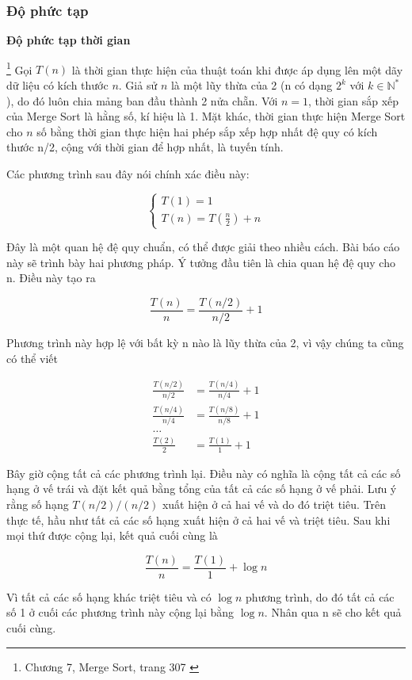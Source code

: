 \subsubsection{Độ phức tạp}
\textbf{Độ phức tạp thời gian}

\footnote{Chương 7, Merge Sort, trang 307 \cite{dsa-analysis-cpp}} Gọi $T(n)$ là thời gian thực hiện của thuật toán khi được áp dụng lên một dãy dữ liệu có kích thước $n$.
Giả sử $n$ là một lũy thừa của 2 (n có dạng $2^k$ với $k \in \mathbb{N}^*$), do đó luôn chia mảng ban đầu thành 2 nửa chẵn. Với $n = 1$, thời gian sắp xếp của Merge Sort là hằng số, kí hiệu là 1. Mặt khác, thời gian thực hiện Merge Sort cho $n$ số bằng thời gian thực hiện hai phép sắp xếp hợp nhất đệ quy có kích thước n/2, cộng với thời gian để hợp nhất, là tuyến tính. 

Các phương trình sau đây nói chính xác điều này:

$$\left\{
\begin{array}{l}
        T(1) = 1 \\
        T(n) = T(\frac{n}{2}) + n
\end{array}
\right.$$

Đây là một quan hệ đệ quy chuẩn, có thể được giải theo nhiều cách. Bài báo cáo này sẽ trình bày hai phương pháp. Ý tưởng đầu tiên là chia quan hệ đệ quy cho n. Điều này tạo ra

$$\frac{T(n)}{n} = \frac{T(n / 2)}{n / 2} + 1$$

Phương trình này hợp lệ với bất kỳ n nào là lũy thừa của 2, vì vậy chúng ta cũng có thể viết 

\begin{align*}
    \frac{T(n/2)}{n/2} &= \frac{T(n / 4)}{n / 4} + 1 \\
    \frac{T(n/4)}{n/4} &= \frac{T(n / 8)}{n / 8} + 1 \\
    \dots \\
    \frac{T(2)}{2} &= \frac{T(1)}{1} + 1
\end{align*}

Bây giờ cộng tất cả các phương trình lại. Điều này có nghĩa là cộng tất cả các số hạng ở vế trái và đặt kết quả bằng tổng của tất cả các số hạng ở vế phải. Lưu ý rằng số hạng $T(n/2)/(n/2)$ xuất hiện ở cả hai vế và do đó triệt tiêu. Trên thực tế, hầu như tất cả các số hạng xuất hiện ở cả hai vế và triệt tiêu. Sau khi mọi thứ được cộng lại, kết quả cuối cùng là 

$$\frac{T(n)}{n} = \frac{T(1)}{1} + \log{n}$$

Vì tất cả các số hạng khác triệt tiêu và có $\log{n}$ phương trình, do đó tất cả các số 1 ở cuối các phương trình này cộng lại bằng $\log{n}$. Nhân qua n sẽ cho kết quả cuối cùng. 

